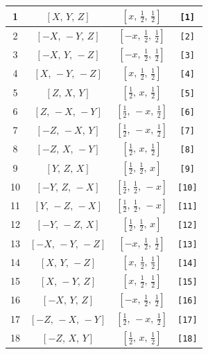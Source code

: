 \documentclass[fleqn,8pt]{jsarticle}
\begin{document}
\begin{longtable}{cccc}
1 & $\left[ X,\, Y,\, Z \right]$ & $\left[ x,\, \frac{1}{2},\, \frac{1}{2} \right]$ & {\tt [1]} \\ \hline
2 & $\left[ - X,\, - Y,\, Z \right]$ & $\left[ - x,\, \frac{1}{2},\, \frac{1}{2} \right]$ & {\tt [2]} \\ \hline
3 & $\left[ - X,\, Y,\, - Z \right]$ & $\left[ - x,\, \frac{1}{2},\, \frac{1}{2} \right]$ & {\tt [3]} \\ \hline
4 & $\left[ X,\, - Y,\, - Z \right]$ & $\left[ x,\, \frac{1}{2},\, \frac{1}{2} \right]$ & {\tt [4]} \\ \hline
5 & $\left[ Z,\, X,\, Y \right]$ & $\left[ \frac{1}{2},\, x,\, \frac{1}{2} \right]$ & {\tt [5]} \\ \hline
6 & $\left[ Z,\, - X,\, - Y \right]$ & $\left[ \frac{1}{2},\, - x,\, \frac{1}{2} \right]$ & {\tt [6]} \\ \hline
7 & $\left[ - Z,\, - X,\, Y \right]$ & $\left[ \frac{1}{2},\, - x,\, \frac{1}{2} \right]$ & {\tt [7]} \\ \hline
8 & $\left[ - Z,\, X,\, - Y \right]$ & $\left[ \frac{1}{2},\, x,\, \frac{1}{2} \right]$ & {\tt [8]} \\ \hline
9 & $\left[ Y,\, Z,\, X \right]$ & $\left[ \frac{1}{2},\, \frac{1}{2},\, x \right]$ & {\tt [9]} \\ \hline
10 & $\left[ - Y,\, Z,\, - X \right]$ & $\left[ \frac{1}{2},\, \frac{1}{2},\, - x \right]$ & {\tt [10]} \\ \hline
11 & $\left[ Y,\, - Z,\, - X \right]$ & $\left[ \frac{1}{2},\, \frac{1}{2},\, - x \right]$ & {\tt [11]} \\ \hline
12 & $\left[ - Y,\, - Z,\, X \right]$ & $\left[ \frac{1}{2},\, \frac{1}{2},\, x \right]$ & {\tt [12]} \\ \hline
13 & $\left[ - X,\, - Y,\, - Z \right]$ & $\left[ - x,\, \frac{1}{2},\, \frac{1}{2} \right]$ & {\tt [13]} \\ \hline
14 & $\left[ X,\, Y,\, - Z \right]$ & $\left[ x,\, \frac{1}{2},\, \frac{1}{2} \right]$ & {\tt [14]} \\ \hline
15 & $\left[ X,\, - Y,\, Z \right]$ & $\left[ x,\, \frac{1}{2},\, \frac{1}{2} \right]$ & {\tt [15]} \\ \hline
16 & $\left[ - X,\, Y,\, Z \right]$ & $\left[ - x,\, \frac{1}{2},\, \frac{1}{2} \right]$ & {\tt [16]} \\ \hline
17 & $\left[ - Z,\, - X,\, - Y \right]$ & $\left[ \frac{1}{2},\, - x,\, \frac{1}{2} \right]$ & {\tt [17]} \\ \hline
18 & $\left[ - Z,\, X,\, Y \right]$ & $\left[ \frac{1}{2},\, x,\, \frac{1}{2} \right]$ & {\tt [18]} \\ \hline

\end{longtable}
\end{document}
